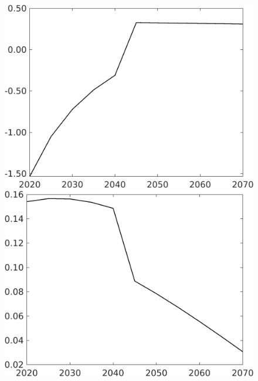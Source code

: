 \documentclass[12pt]{article}
\begin{document}
\begin{figure}[h!!]
\begin{minipage}[]{0.32\textwidth}
\end{minipage}		
\begin{minipage}[]{0.32\textwidth}
\includegraphics[width=1\textwidth]{../../codding_model/own_basedOnFried/optimalPol_010922_revision/figures/all_13Sept22/CompTaufPER_bytaul_Reg0_gAg_spillover0_nsk0_xgr0_knspil0_sep1_LFlimit1_emsbase0_countec0_GovRev0_etaa0.79_lgd0.png}
\end{minipage}
\begin{minipage}[]{0.32\textwidth}
\includegraphics[width=1\textwidth]{../../codding_model/own_basedOnFried/optimalPol_010922_revision/figures/all_13Sept22/CompTaufPER_bytaul_Reg0_gAn_spillover0_nsk0_xgr0_knspil0_sep1_LFlimit1_emsbase0_countec0_GovRev0_etaa0.79_lgd0.png}

\end{minipage}
\end{figure}
\end{document}
